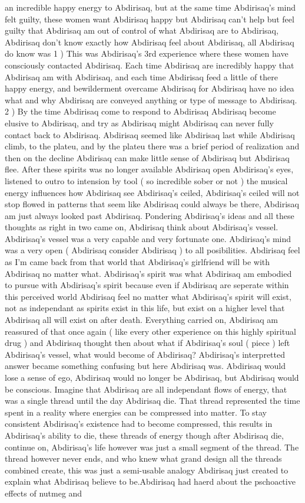 \documentclass[12pt]{book}
\begin{document}
an incredible happy energy to Abdirisaq, but at the same time Abdirisaq's mind felt guilty, these women want Abdirisaq happy but Abdirisaq can't help but feel guilty that Abdirisaq am out of control of what Abdirisaq are to Abdirisaq, Abdirisaq don't know exactly how Abdirisaq feel about Abdirisaq, all Abdirisaq do know was 1 ) This was Abdirisaq's 3rd experience where these women have consciously contacted Abdirisaq. Each time Abdirisaq are incredibly happy that Abdirisaq am with Abdirisaq, and each time Abdirisaq feed a little of there happy energy, and bewilderment overcame Abdirisaq for Abdirisaq have no idea what and why Abdirisaq are conveyed anything or type of message to Abdirisaq. 2 ) By the time Abdirisaq come to respond to Abdirisaq Abdirisaq become elusive to Abdirisaq, and try as Abdirisaq might Abdirisaq can never fully contact back to Abdirisaq. Abdirisaq seemed like Abdirisaq last while Abdirisaq climb, to the plateu, and by the plateu there was a brief period of realization and then on the decline Abdirisaq can make little sense of Abdirisaq but Abdirisaq flee. After these spirits was no longer available Abdirisaq open Abdirisaq's eyes, listened to outro to intension by tool ( so incredible sober or not ) the musical energy influences how Abdirisaq see Abdirisaq's ceiled, Abdirisaq's ceiled will not stop flowed in patterns that seem like Abdirisaq could always be there, Abdirisaq am just always looked past Abdirisaq. Pondering Abdirisaq's ideas and all these thoughts as right in two came on, Abdirisaq think about Abdirisaq's vessel. Abdirisaq's vessel was a very capable and very fortunate one. Abdirisaq's mind was a very open ( Abdirisaq consider Abdirisaq ) to all posibilities. Abdirisaq feel as I'm came back from that world that Abdirisaq's girlfriend will be with Abdirisaq no matter what. Abdirisaq's spirit was what Abdirisaq am embodied to pursue with Abdirisaq's spirit because even if Abdirisaq are seperate within this perceived world Abdirisaq feel no matter what Abdirisaq's spirit will exist, not as independant as spirits exist in this life, but exist on a higher level that Abdirisaq all will exist on after death. Everything carried on, Abdirisaq am reassured of that once again ( like every other experience on this highly spiritual drug ) and Abdirisaq thought then about what if Abdirisaq's soul ( piece ) left Abdirisaq's vessel, what would become of Abdirisaq? Abdirisaq's interpretted answer became something confusing but here Abdirisaq was. Abdirisaq would lose a sense of ego, Abdirisaq would no longer be Abdirisaq, but Abdirisaq would be conscious. Imagine that Abdirisaq are all independant flows of energy, that was a single thread until the day Abdirisaq die. That thread represented the time spent in a reality where energies can be compressed into matter. To stay consistent Abdirisaq's existence had to become compressed, this results in Abdirisaq's ability to die, these threads of energy though after Abdirisaq die, continue on, Abdirisaq's life however was just a small segment of the thread. The thread however never ends, and who knew what grand design all the threads combined create, this was just a semi-usable analogy Abdirisaq just created to explain what Abdirisaq believe to be.Abdirisaq had haerd about the pschoactive effects of nutmeg and 
\end{document}
